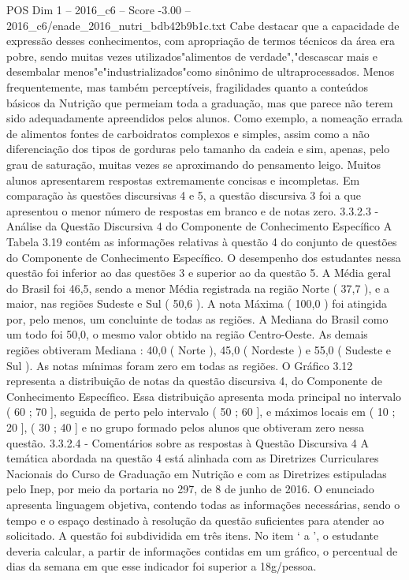 \begin{textsample}{POS Dim 1 – 2016\_c6 – Score -3.00 – 2016\_c6/enade\_2016\_nutri\_bdb42b9b1c.txt}
Cabe destacar que a capacidade de expressão desses conhecimentos, com apropriação de termos técnicos da área era pobre, sendo muitas vezes utilizados"alimentos de verdade","descascar mais e desembalar menos"e"industrializados"como sinônimo de ultraprocessados.
Menos frequentemente, mas também perceptíveis, fragilidades quanto a conteúdos básicos da Nutrição que permeiam toda a graduação, mas que parece não terem sido adequadamente apreendidos pelos alunos.
Como exemplo, a nomeação errada de alimentos fontes de carboidratos complexos e simples, assim como a não diferenciação dos tipos de gorduras pelo tamanho da cadeia e sim, apenas, pelo grau de saturação, muitas vezes se aproximando do pensamento leigo.
Muitos alunos apresentarem respostas extremamente concisas e incompletas.
Em comparação às questões discursivas 4 e 5, a questão discursiva 3 foi a que apresentou o menor número de respostas em branco e de notas zero. 3.3.2.3 - Análise da Questão Discursiva 4 do Componente de Conhecimento Específico A Tabela 3.19 contém as informações relativas à questão 4 do conjunto de questões do Componente de Conhecimento Específico.
O desempenho dos estudantes nessa questão foi inferior ao das questões 3 e superior ao da questão 5.
A Média geral do Brasil foi 46,5, sendo a menor Média registrada na região Norte ( 37,7 ), e a maior, nas regiões Sudeste e Sul ( 50,6 ).
A nota Máxima ( 100,0 ) foi atingida por, pelo menos, um concluinte de todas as regiões.
A Mediana do Brasil como um todo foi 50,0, o mesmo valor obtido na região Centro-Oeste.
As demais regiões obtiveram Mediana : 40,0 ( Norte ), 45,0 ( Nordeste ) e 55,0 ( Sudeste e Sul ).
As notas mínimas foram zero em todas as regiões.
O Gráfico 3.12 representa a distribuição de notas da questão discursiva 4, do Componente de Conhecimento Específico.
Essa distribuição apresenta moda principal no intervalo ( 60 ; 70 ], seguida de perto pelo intervalo ( 50 ; 60 ], e máximos locais em ( 10 ; 20 ], ( 30 ; 40 ] e no grupo formado pelos alunos que obtiveram zero nessa questão. 3.3.2.4 - Comentários sobre as respostas à Questão Discursiva 4 A temática abordada na questão 4 está alinhada com as Diretrizes Curriculares Nacionais do Curso de Graduação em Nutrição e com as Diretrizes estipuladas pelo Inep, por meio da portaria no 297, de 8 de junho de 2016.
O enunciado apresenta linguagem objetiva, contendo todas as informações necessárias, sendo o tempo e o espaço destinado à resolução da questão suficientes para atender ao solicitado.
A questão foi subdividida em três itens.
No item ‘ a ’, o estudante deveria calcular, a partir de informações contidas em um gráfico, o percentual de dias da semana em que esse indicador foi superior a 18g/pessoa.

\end{textsample}
